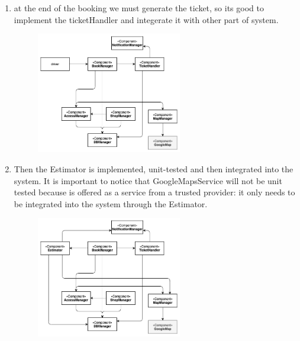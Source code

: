 \begin{enumerate}
\item at the end of the booking we must generate the ticket, so its good to implement the ticketHandler and integerate it with other part of system.
\begin{figure}[H]
  \centering
  \includegraphics[width=0.6\textwidth,keepaspectratio]{images/IS/IS5.png}
\end{figure}

\item Then the Estimator is implemented, unit-tested and then integrated into the system. It is important to notice that GoogleMapsService will not be unit tested because is offered as a service from a trusted provider: it only needs to be integrated into the system through the Estimator.\\
\begin{figure}[H]
  \centering
  \includegraphics[width=0.6\textwidth,keepaspectratio]{images/IS/IS6.png}
\end{figure}


\end{enumerate}
